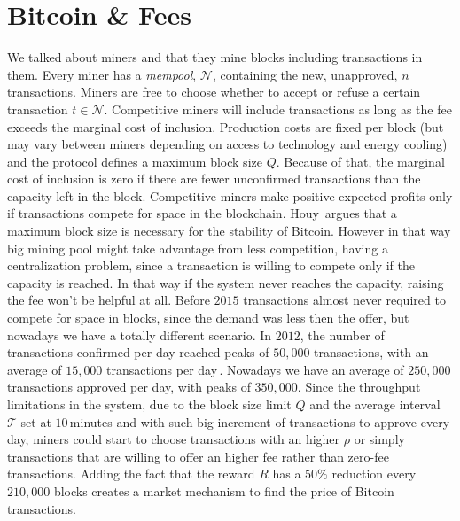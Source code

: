 \documentclass[USenglish]{uit-thesis}
\begin{document}
\section{Bitcoin \& Fees}
\label{sec:bitcoinfee}
We talked about miners and that they mine blocks including
transactions in them. Every miner has a \emph{mempool}, $\mathcal{N}$,
containing the new, unapproved, $n$ transactions.
Miners are free to choose
whether to accept or refuse a certain transaction $t \in \mathcal{N}$.
Competitive miners will include transactions as long as the fee exceeds
the marginal cost of inclusion. Production costs are fixed
per block (but may vary between miners depending on access to
technology and energy cooling) and the protocol
defines a maximum block size $Q$.
Because of that, the marginal cost of inclusion is zero if there are
fewer unconfirmed transactions than the capacity left in the block.
Competitive miners make positive expected profits only if transactions
compete for space in the blockchain. Houy\,\cite{RePEc:gat:wpaper:1407}
argues that a maximum block size is necessary for the stability of Bitcoin.
However in that way big mining pool might take advantage from less competition,
having a centralization problem, since a transaction is willing to
compete only if the capacity is reached.
In that way if the system never reaches the capacity, raising the fee
won't be helpful at all. Before $2015$ transactions almost
never required to compete for space in blocks, since the demand
was less then the offer, but nowadays we have a totally different
scenario. 
In $2012$, the number of transactions confirmed per day
reached peaks of $50,000$ transactions, with an average of
$15,000$ transactions per day\,\cite{bitcoin_blockchain}.
Nowadays we have an average of $250,000$ transactions
approved per day, with peaks of $350,000$. Since the throughput
limitations in the system, due to the block size limit $Q$
and the average interval $\mathcal{T}$ set at $10$\,minutes and
with such big increment of transactions to approve every day,
miners could start to choose transactions with an higher
$\rho$ or simply transactions that are willing to offer an higher fee
rather than zero-fee transactions.
Adding the fact that the reward $R$ has a $50\%$ reduction every
$210,000$ blocks creates a market mechanism to find the price
of Bitcoin transactions.
\end{document}
